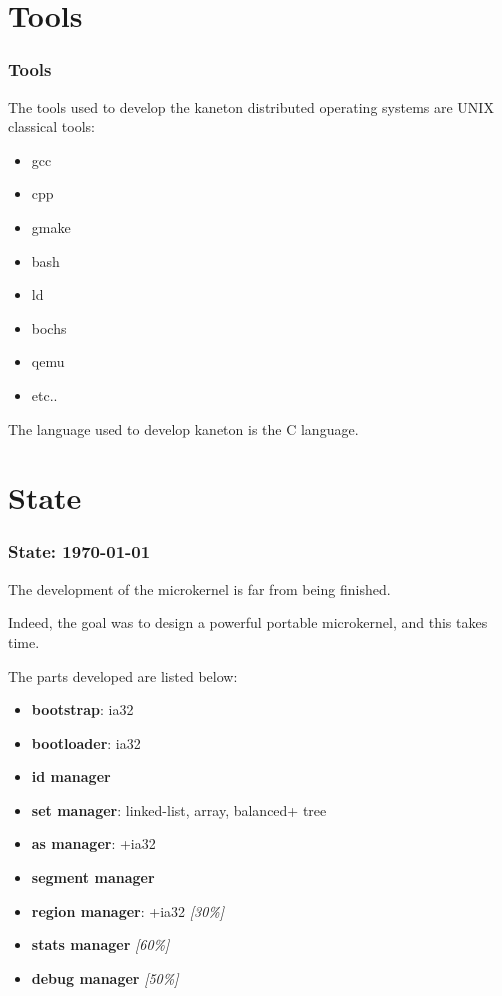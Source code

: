 %
%

\section{Tools}


\begin{frame}
  \frametitle{Tools}

  The tools used to develop the kaneton distributed operating systems
  are UNIX classical tools:

  \begin{itemize}
    \item
      gcc
    \item
      cpp
    \item
      gmake
    \item
      bash
    \item
      ld
    \item
      bochs
    \item
      qemu
    \item
      etc..
  \end{itemize}

  \nl

  The language used to develop kaneton is the C language.
\end{frame}

%
%

\section{State}


\begin{frame}
  \frametitle{State: \textbf{\today}}

  The development of the microkernel is far from being finished.

  \nl

  Indeed, the goal was to design a powerful portable microkernel, and this
  takes time.

  \nl

  The parts developed are listed below:

  \begin{itemize}[<+->]
    \item
      \textbf{bootstrap}: ia32
    \item
      \textbf{bootloader}: ia32
    \item
      \textbf{id manager}
    \item
      \textbf{set manager}: linked-list, array, balanced+ tree
    \item
      \textbf{as manager}: +ia32
    \item
      \textbf{segment manager}
    \item
      \textbf{region manager}: +ia32 \textit{[30\%]}
    \item
      \textbf{stats manager} \textit{[60\%]}
    \item
      \textbf{debug manager} \textit{[50\%]}
  \end{itemize}
\end{frame}

